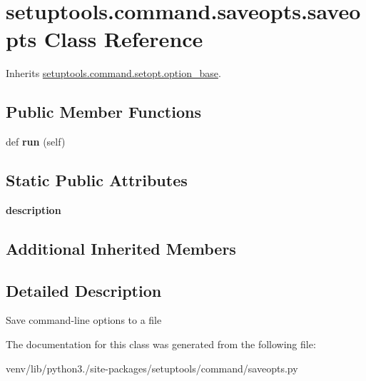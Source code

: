 \hypertarget{classsetuptools_1_1command_1_1saveopts_1_1saveopts}{}\section{setuptools.\+command.\+saveopts.\+saveopts Class Reference}
\label{classsetuptools_1_1command_1_1saveopts_1_1saveopts}


Inherits \hyperlink{classsetuptools_1_1command_1_1setopt_1_1option__base}{setuptools.\+command.\+setopt.\+option\+\_\+base}.

\subsection*{Public Member Functions}
\begin{DoxyCompactItemize}
\item 
\mbox{\label{classsetuptools_1_1command_1_1saveopts_1_1saveopts_a940f6b5dbe02cbfb72342fd1fd14920b}} 
def {\bfseries run} (self)
\end{DoxyCompactItemize}
\subsection*{Static Public Attributes}
\begin{DoxyCompactItemize}
\item 
\mbox{\label{classsetuptools_1_1command_1_1saveopts_1_1saveopts_af78e92ede2fea32591d26970188c9fd9}} 
{\bfseries description}
\end{DoxyCompactItemize}
\subsection*{Additional Inherited Members}


\subsection{Detailed Description}
\begin{DoxyVerb}Save command-line options to a file\end{DoxyVerb}
 

The documentation for this class was generated from the following file\+:\begin{DoxyCompactItemize}
\item 
venv/lib/python3./site-\/packages/setuptools/command/saveopts.\+py\end{DoxyCompactItemize}
